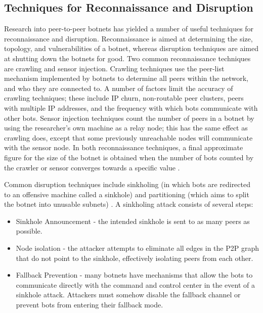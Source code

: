 \documentclass{acm_proc_article-sp}
\begin{document}
\subsection{Techniques for Reconnaissance and Disruption}

Research into peer-to-peer botnets has yielded a number of useful techniques for reconnaissance and disruption.  Reconnaissance is aimed at determining the size, topology, and vulnerabilities of a botnet, whereas disruption techniques are aimed at shutting down the botnets for good.  Two common reconnaissance techniques are crawling and sensor injection.  Crawling techniques use the peer-list mechanism implemented by botnets to determine all peers within the network, and who they are connected to. A number of factors limit the accuracy of crawling techniques; these include IP churn, non-routable peer clusters, peers with multiple IP addresses, and the frequency with which bots communicate with other bots.  Sensor injection techniques count the number of peers in a botnet by using the researcher's own machine as a relay node; this has the same effect as crawling does, except that some previously unreachable nodes will communicate with the sensor node.  In both reconnaissance techniques, a final approximate figure for the size of the botnet is obtained when the number of bots counted by the crawler or sensor converges towards a specific value \cite{stone:p2p}\cite{defcon:prowling}.

Common disruption techniques include sinkholing (in which bots are redirected to an offensive machine called a sinkhole) and partitioning (which aims to split the botnet into unusable subnets) \cite{stone:p2p}.  A sinkholing attack consists of several steps:
\begin{itemize}
\item Sinkhole Announcement - the intended sinkhole is sent to as many peers as possible.
\item Node isolation - the attacker attempts to eliminate all edges in the P2P graph that do not point to the sinkhole, effectively isolating peers from each other.
\item Fallback Prevention - many botnets have mechanisms that allow the bots to communicate directly with the command and control center in the event of a sinkhole attack.  Attackers must somehow disable the fallback channel or prevent bots from entering their fallback mode.
\end{itemize}
\end{document}
